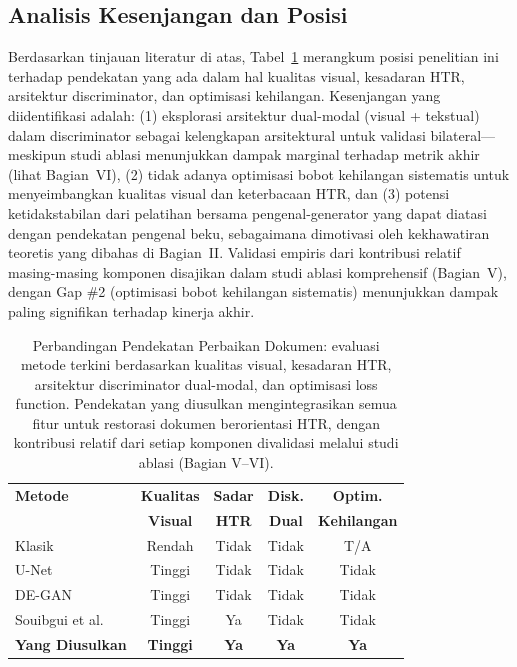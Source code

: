 \documentclass[journal]{IEEEtran}
\begin{document}
\subsection{Analisis Kesenjangan dan Posisi}

Berdasarkan tinjauan literatur di atas, Tabel~\ref{table_comparison} merangkum posisi penelitian ini terhadap pendekatan yang ada dalam hal kualitas visual, kesadaran HTR, arsitektur discriminator, dan optimisasi kehilangan. Kesenjangan yang diidentifikasi adalah: (1) eksplorasi arsitektur dual-modal (visual + tekstual) dalam discriminator sebagai kelengkapan arsitektural untuk validasi bilateral---meskipun studi ablasi menunjukkan dampak marginal terhadap metrik akhir (lihat Bagian~VI), (2) tidak adanya optimisasi bobot kehilangan sistematis untuk menyeimbangkan kualitas visual dan keterbacaan HTR, dan (3) potensi ketidakstabilan dari pelatihan bersama pengenal-generator yang dapat diatasi dengan pendekatan pengenal beku, sebagaimana dimotivasi oleh kekhawatiran teoretis yang dibahas di Bagian~II. Validasi empiris dari kontribusi relatif masing-masing komponen disajikan dalam studi ablasi komprehensif (Bagian~V), dengan Gap \#2 (optimisasi bobot kehilangan sistematis) menunjukkan dampak paling signifikan terhadap kinerja akhir.

\begin{table}[!ht]
\renewcommand{\arraystretch}{1.3}
\caption{Perbandingan Pendekatan Perbaikan Dokumen: evaluasi metode terkini berdasarkan kualitas visual, kesadaran HTR, arsitektur discriminator dual-modal, dan optimisasi loss function. Pendekatan yang diusulkan mengintegrasikan semua fitur untuk restorasi dokumen berorientasi HTR, dengan kontribusi relatif dari setiap komponen divalidasi melalui studi ablasi (Bagian V--VI).}
\label{table_comparison}
\centering
\begin{tabular}{|l|c|c|c|c|}
\hline
\textbf{Metode} & \textbf{Kualitas} & \textbf{Sadar} & \textbf{Disk.} & \textbf{Optim.} \\
 & \textbf{Visual} & \textbf{HTR} & \textbf{Dual} & \textbf{Kehilangan} \\
\hline
Klasik & Rendah & Tidak & Tidak & T/A \\
U-Net & Tinggi & Tidak & Tidak & Tidak \\
DE-GAN & Tinggi & Tidak & Tidak & Tidak \\
Souibgui et al. & Tinggi & Ya & Tidak & Tidak \\
\textbf{Yang Diusulkan} & \textbf{Tinggi} & \textbf{Ya} & \textbf{Ya} & \textbf{Ya} \\
\hline
\end{tabular}
\end{table}
\end{document}
